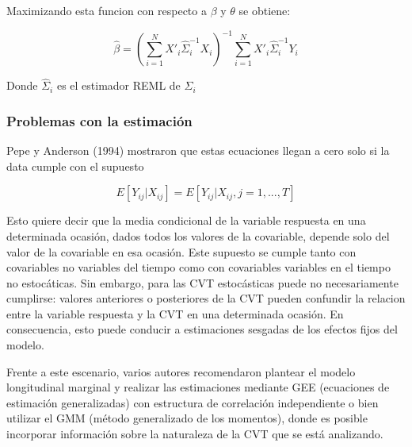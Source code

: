 \documentclass[spanish]{article}
\numberwithin{figure}{subsection}
\numberwithin{equation}{subsection}
\numberwithin{table}{subsection}
\begin{document}
Maximizando esta funcion con respecto a $\beta$ y $\theta$ se obtiene:

\[ \hat{\beta} = (\sum_{i=1}^{N} X'_i \hat{\varSigma}_i^{-1} X_i)^{-1}
\sum_{i=1}^{N} X'_i \hat{\varSigma}_i^{-1} Y_i\]

Donde $\hat{\varSigma}_i$ es el estimador REML de ${\varSigma_i}$

\subsubsection{Problemas con la estimación}

Pepe y Anderson (1994) mostraron que estas ecuaciones llegan a cero solo si la
data cumple con el supuesto

\begin{equation}
\label{estimation_issue}
	E[Y_{ij} | X_{ij}] = E[Y_{ij} | X_{ij}, j = 1, ..., T]
\end{equation}

Esto quiere decir que la media condicional de la variable respuesta en una
determinada ocasión, dados todos los valores de la covariable, depende solo del
valor de la covariable en esa ocasión. Este supuesto se cumple tanto con
covariables no variables del tiempo como con covariables variables en el tiempo
no estocáticas. Sin embargo, para las CVT estocásticas puede no necesariamente
cumplirse: valores anteriores o posteriores de la CVT pueden confundir la
relacion entre la variable respuesta y la CVT en una determinada ocasión. En
consecuencia, esto puede conducir a estimaciones sesgadas de los efectos fijos
del modelo.

Frente a este escenario, varios autores recomendaron plantear el modelo
longitudinal marginal y realizar las estimaciones mediante GEE (ecuaciones de
estimación generalizadas) con estructura de correlación independiente o bien
utilizar el GMM (método generalizado de los momentos), donde es posible
incorporar información sobre la naturaleza de la CVT que se está analizando.

\newpage


\end{document}
